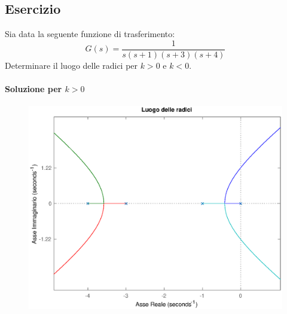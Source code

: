 \subsection{Esercizio}
Sia data la seguente funzione di trasferimento:
\[
	G(s) = \frac{1}{s(s+1)(s+3)(s+4)}
\]
Determinare il luogo delle radici per \(k>0\) e \(k<0\).

\paragraph{Soluzione per \(k > 0\)}

\begin{figure}[ht]
	\centering
	\includegraphics[scale=.6]{mod1/assets/rl_ex38}
\end{figure}

